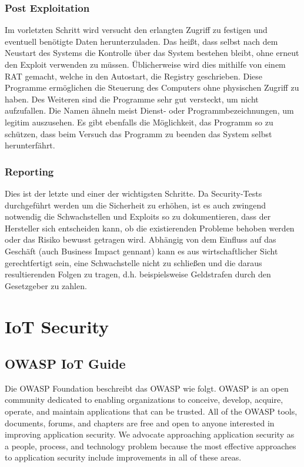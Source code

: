    \subsubsection{\glqq Post Exploitation\grqq{}}
        Im vorletzten Schritt wird versucht den erlangten Zugriff zu festigen und eventuell benötigte Daten herunterzuladen. Das heißt, dass selbst nach dem Neustart des Systems die Kontrolle über das System bestehen bleibt, ohne erneut den Exploit verwenden zu müssen. Üblicherweise wird dies mithilfe von einem \ac{RAT} gemacht, welche in den Autostart, die Registry geschrieben. Diese Programme ermöglichen die Steuerung des Computers ohne physischen Zugriff zu haben. Des Weiteren sind die Programme sehr gut versteckt, um nicht aufzufallen. Die Namen ähneln meist Dienst- oder Programmbezeichnungen, um legitim auszusehen. Es gibt ebenfalls die Möglichkeit, das Programm so zu schützen, dass beim Versuch das Programm zu beenden das System selbst herunterfährt.
    \subsubsection{\glqq Reporting\grqq{}}
        Dies ist der letzte und einer der wichtigsten Schritte. Da Security-Tests durchgeführt werden um die Sicherheit zu erhöhen, ist es auch zwingend notwendig die Schwachstellen und Exploits so zu dokumentieren, dass der Hersteller sich entscheiden kann, ob die existierenden Probleme behoben werden oder das Risiko bewusst getragen wird. Abhängig von dem Einfluss auf das Geschäft (auch \glqq Business Impact\grqq{} gennant) kann es aus wirtschaftlicher Sicht gerechtfertigt sein, eine Schwachstelle nicht zu schließen und die daraus resultierenden Folgen zu tragen, d.h. beispielsweise Geldstrafen durch den Gesetzgeber zu zahlen.

\section{IoT Security} \label{IoTSecurity}
    \subsection{OWASP IoT Guide}
        Die OWASP Foundation \cite{guzman_2019} beschreibt das \ac{OWASP} wie folgt.
        \glqq OWASP is an open community dedicated to enabling organizations to conceive, develop, acquire, operate, and maintain applications that can be trusted. All of the OWASP tools, documents, forums, and chapters are free and open to anyone interested in improving application security. We advocate approaching application security as a people, process, and technology problem because the most effective approaches to application security include improvements in all of these areas.\grqq{}
        
